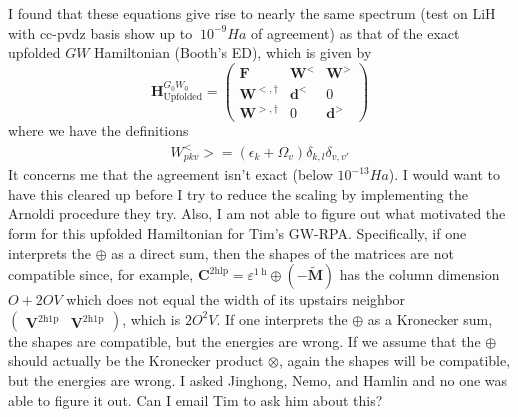 \begin{tcolorbox}[colback=red!10!white, colframe=red!50!black, title=It is unclear where these equations come from]
I found that these equations give rise to nearly the same spectrum (test on LiH with cc-pvdz basis show up to $~10^{-9} Ha$ of agreement) as that of the exact upfolded $GW$ Hamiltonian (Booth's ED), which is given by
\begin{equation}
    \bm{H}_{\text{Upfolded}}^{G_0W_0} = \begin{pmatrix} \bm{F} & \bm{W}^< & \bm{W}^> \\ \bm{W}^{<,\dagger} & \bm{d}^< & 0 \\ \bm{W}^{>, \dagger} & 0 & \bm{d}^> \end{pmatrix}
\label{eq:booth_hamiltonian}
\end{equation}
where we have the definitions
\begin{align}
    W_{pkv}^< > = \left(\epsilon_k + \Omega_v\right) \delta_{k,l} \delta_{v,v'}
\label{eq:booth_definitions}
\end{align}
It concerns me that the agreement isn't exact (below $10^{-13} Ha$). I would want to have this cleared up before I try to reduce the scaling by implementing the Arnoldi procedure they try. Also, I am not able to figure out what motivated the form for this upfolded Hamiltonian for Tim's GW-RPA. Specifically, if one interprets the $\oplus$ as a direct sum, then the shapes of the matrices are not compatible since, for example, $\mathbf{C}^{2 \mathrm{hlp}}=\varepsilon^{1 \mathrm{~h}} \oplus(-\tilde{\mathbf{M}})$ has the column dimension $O+2OV$ which does not equal the width of its upstairs neighbor $\begin{pmatrix}
    \bm{V}^{2\mathrm{h1p}} & \bm{V}^{2\mathrm{h1p}}
\end{pmatrix}$, which is $2O^2V$. If one interprets the $\oplus$ as a Kronecker sum, the shapes are compatible, but the energies are wrong. If we assume that the $\oplus$ should actually be the Kronecker product $\otimes$, again the shapes will be compatible, but the energies are wrong. I asked Jinghong, Nemo, and Hamlin and no one was able to figure it out. Can I email Tim to ask him about this?

\end{tcolorbox}
